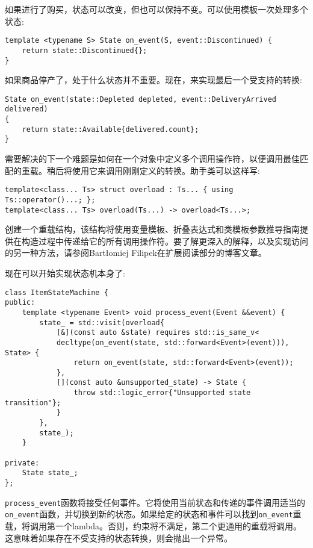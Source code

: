 如果进行了购买，状态可以改变，但也可以保持不变。可以使用模板一次处理多个状态:

\begin{lstlisting}[style=styleCXX]
template <typename S> State on_event(S, event::Discontinued) {
	return state::Discontinued{};
}
\end{lstlisting}

如果商品停产了，处于什么状态并不重要。现在，来实现最后一个受支持的转换:

\begin{lstlisting}[style=styleCXX]
State on_event(state::Depleted depleted, event::DeliveryArrived delivered)
{
	return state::Available{delivered.count};
}
\end{lstlisting}

需要解决的下一个难题是如何在一个对象中定义多个调用操作符，以便调用最佳匹配的重载。稍后将使用它来调用刚刚定义的转换。助手类可以这样写:

\begin{lstlisting}[style=styleCXX]
template<class... Ts> struct overload : Ts... { using Ts::operator()...; };
template<class... Ts> overload(Ts...) -> overload<Ts...>;
\end{lstlisting}

创建一个重载结构，该结构将使用变量模板、折叠表达式和类模板参数推导指南提供在构造过程中传递给它的所有调用操作符。要了解更深入的解释，以及实现访问的另一种方法，请参阅Bartłomiej Filipek在扩展阅读部分的博客文章。

现在可以开始实现状态机本身了:

\begin{lstlisting}[style=styleCXX]
class ItemStateMachine {
public:
	template <typename Event> void process_event(Event &&event) {
		state_ = std::visit(overload{
			[&](const auto &state) requires std::is_same_v<
			decltype(on_event(state, std::forward<Event>(event))), State> {
				return on_event(state, std::forward<Event>(event));
			},
			[](const auto &unsupported_state) -> State {
				throw std::logic_error{"Unsupported state transition"};
			}
		},
		state_);
	}

private:
	State state_;
};
\end{lstlisting}

\texttt{process\_event}函数将接受任何事件。它将使用当前状态和传递的事件调用适当的\texttt{on\_event}函数，并切换到新的状态。如果给定的状态和事件可以找到\texttt{on\_event}重载，将调用第一个lambda。否则，约束将不满足，第二个更通用的重载将调用。这意味着如果存在不受支持的状态转换，则会抛出一个异常。

